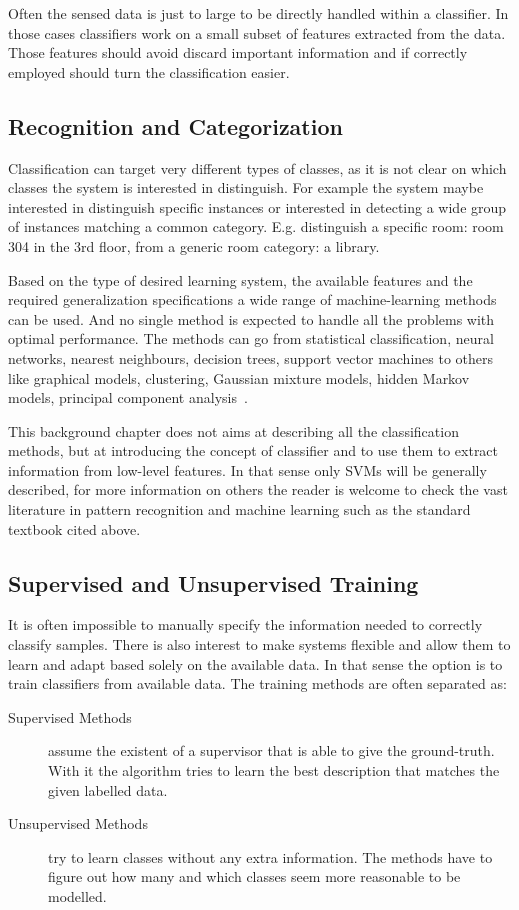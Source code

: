 Often the sensed data is just to large to be directly handled within a classifier. In those
cases classifiers work on a small subset of features extracted from the data. Those features
should avoid discard important information and if correctly employed should turn the classification
easier.

\subsection{Recognition and Categorization}
Classification can target very different types of classes, as it is not clear on which classes
the system is interested in distinguish. For example the system maybe interested in distinguish
specific instances or interested in detecting a wide group of instances matching a
common category. E.g. distinguish a specific room: room 304 in the 3rd floor, from a generic room
category: a library.

Based on the type of desired learning system, the available features and the required generalization
specifications a wide range of machine-learning methods can be used. And no single method
is expected to handle all the problems with optimal performance.
The methods can go from statistical classification, neural networks, nearest neighbours,
decision trees, support vector machines to others like graphical models, clustering,
Gaussian mixture models, hidden Markov models, principal component analysis~\cite{bishop2006pattern}.

This background chapter does not aims at describing all the classification methods, but at
introducing the concept of classifier and to use them to extract information from low\hyp{}level
features. In that sense only \glspl{SVM} will be generally described, for more information
on others the reader is welcome to check the vast literature in pattern recognition and machine
learning such as the standard textbook cited above.

\subsection{Supervised and Unsupervised Training}
It is often impossible to manually specify the information needed to correctly classify samples.
There is also interest to make systems flexible and allow them to learn and adapt based solely
on the available data. In that sense the option is to train classifiers from available data.
The training methods are often separated as:

\begin{description}
\item[Supervised Methods] assume the existent of a supervisor that is able to give the
ground\hyp{}truth. With it the algorithm tries to learn the best description that matches
the given labelled data.
\item[Unsupervised Methods] try to learn classes without any extra information. The methods
have to figure out how many and which classes seem more reasonable to be modelled.
\end{description}

